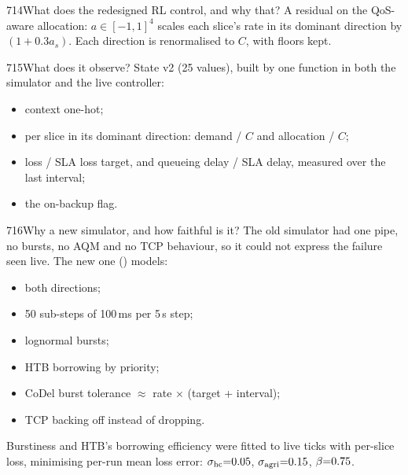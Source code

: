 \begin{qa}{714}{What does the redesigned RL control, and why that?}
A residual on the QoS-aware allocation: $a\in[-1,1]^4$ scales each slice's rate in its dominant direction by
$(1+0.3a_s)$. Each direction is renormalised to $C$, with floors kept.
\end{qa}

\begin{qa}{715}{What does it observe?}
State v2 (25 values), built by one function in both the simulator and the live controller:
\begin{itemize}
\item context one-hot;
\item per slice in its dominant direction: demand / $C$ and allocation / $C$;
\item loss / SLA loss target, and queueing delay / SLA delay, measured over the last interval;
\item the on-backup flag.
\end{itemize}
\end{qa}

\begin{qa}{716}{Why a new simulator, and how faithful is it?}
The old simulator had one pipe, no bursts, no AQM and no TCP behaviour, so it could not express the failure seen live.
The new one () models:
\begin{itemize}
\item both directions;
\item 50 sub-steps of 100\,ms per 5\,s step;
\item lognormal bursts;
\item HTB borrowing by priority;
\item CoDel burst tolerance $\approx$ rate $\times$ (target + interval);
\item TCP backing off instead of dropping.
\end{itemize}
Burstiness and HTB's borrowing efficiency were fitted to \NCalTicks{} live ticks with per-slice loss, minimising per-run mean
loss error: $\sigma_{\mathrm{hc}}{=}0.05$, $\sigma_{\mathrm{agri}}{=}0.15$, $\beta{=}0.75$.
\end{qa}

